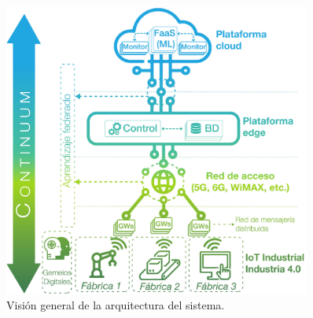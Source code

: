 \begin{figure}[ht!]
    \centering
    \includegraphics[width=0.9\textwidth]{fig/08_datadriven/datadriven_01.pdf}
    \caption{Visión general de la arquitectura del sistema.}
    \label{fig:draft_sysarch}
\end{figure}

